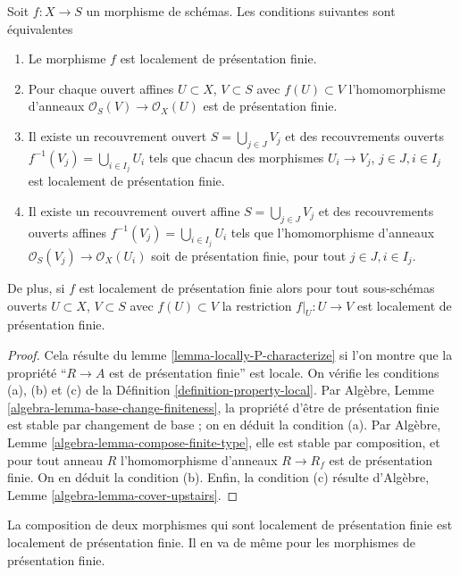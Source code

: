 \begin{lemma}
\label{lemma-locally-finite-presentation-characterize}
Soit $f : X \to S$ un morphisme de schémas. Les conditions
suivantes sont équivalentes
\begin{enumerate}
\item Le morphisme $f$ est localement de présentation finie.
\item Pour chaque ouvert affines $U \subset X$, $V \subset S$
avec $f(U) \subset V$ l'homomorphisme
d'anneaux $\mathcal{O}_S(V) \to \mathcal{O}_X(U)$ est de présentation finie.
\item Il existe un recouvrement ouvert $S = \bigcup_{j \in J} V_j$ et
des recouvrements ouverts $f^{-1}(V_j) = \bigcup_{i \in I_j} U_i$ tels que chacun
des morphismes $U_i \to V_j$, $j\in J, i\in I_j$ est localement
de présentation finie.
\item Il existe un recouvrement ouvert affine $S = \bigcup_{j \in J} V_j$
et des recouvrements ouverts affines $f^{-1}(V_j) = \bigcup_{i \in I_j} U_i$ tels
que l'homomorphisme d'anneaux $\mathcal{O}_S(V_j) \to \mathcal{O}_X(U_i)$ soit de présentation
finie, pour tout $j\in J, i\in I_j$.
\end{enumerate}
De plus, si $f$ est localement de présentation finie alors
pour tout sous-schémas ouverts $U \subset X$, $V \subset S$ avec $f(U) \subset V$
la restriction $f|_U : U \to V$ est localement de présentation finie.
\end{lemma}

\begin{proof}
Cela résulte du lemme \ref{lemma-locally-P-characterize} si l'on montre que la propriété ``$R \to A$
est de présentation finie'' est locale.
On vérifie les conditions (a), (b) et (c) de
la Définition \ref{definition-property-local}. Par
Algèbre, Lemme \ref{algebra-lemma-base-change-finiteness}, la propriété d'être de présentation finie est
stable par changement de base ; on en déduit la condition (a).
Par Algèbre, Lemme \ref{algebra-lemma-compose-finite-type},
elle est stable par composition, et
pour tout anneau $R$ l'homomorphisme
d'anneaux $R \to R_f$ est de présentation finie.
On en déduit la condition (b). Enfin, la
condition (c) résulte d'Algèbre, Lemme \ref{algebra-lemma-cover-upstairs}.
\end{proof}

\begin{lemma}
\label{lemma-composition-finite-presentation}
La composition de deux morphismes qui sont localement de présentation finie est localement
de présentation finie. Il
en va de même pour les morphismes de présentation finie.
\end{lemma}

